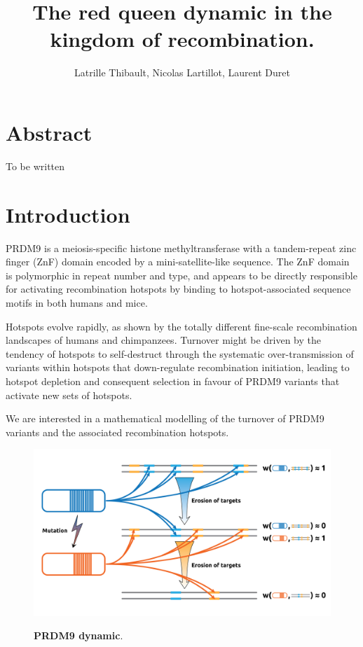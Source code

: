 \documentclass{article}
\author{Latrille Thibault, Nicolas Lartillot, Laurent Duret}
\title{The red queen dynamic in the kingdom of recombination.}
\begin{document}
\maketitle 


\section{Abstract}

To be written 

\section{Introduction}

PRDM9 is a meiosis-specific histone methyltransferase with a tandem-repeat zinc finger (ZnF) domain encoded by a mini-satellite-like sequence. The ZnF domain is polymorphic in repeat number and type, and appears to be directly responsible for activating recombination hotspots by binding to hotspot-associated sequence motifs in both humans and mice.

Hotspots evolve rapidly, as shown by the totally different fine-scale recombination landscapes of humans and chimpanzees.
Turnover might be driven by the tendency of hotspots to self-destruct through the systematic over-transmission of variants within hotspots that down-regulate recombination initiation, leading to hotspot depletion and consequent 
selection in favour of PRDM9 variants that activate new sets of hotspots.

We are interested in a mathematical modelling of the turnover of PRDM9 variants and the associated recombination hotspots.

	\begin{figure}[H]
	  \centering
       \includegraphics[width=12.0cm]{Images/RedQueen.png}\\
		\caption{ \textbf{PRDM9 dynamic}. 
		\label{fig:redqueen}}
	\end{figure}
	
\end{document}
